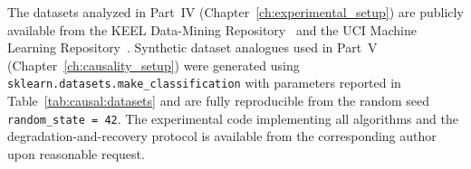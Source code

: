 \documentclass[12pt, a4paper, twoside, openright]{book}
\theoremstyle{plain}
\theoremstyle{definition}
\begin{document}
The datasets analyzed in Part~IV (Chapter~\ref{ch:experimental_setup}) are
publicly available from the KEEL Data-Mining Repository~\cite{alcala2011keel}
and the UCI Machine Learning Repository~\cite{uci2017}.
Synthetic dataset analogues used in Part~V
(Chapter~\ref{ch:causality_setup}) were generated using
\texttt{sklearn.datasets.make\_classification} with parameters reported in
Table~\ref{tab:causal:datasets} and are fully reproducible from the random
seed \texttt{random\_state = 42}.
The experimental code implementing all algorithms and the
degradation-and-recovery protocol is available from the corresponding author
upon reasonable request.

\cleardoublepage
{}
{}
\printbibliography[title={Bibliography}]
\end{document}
